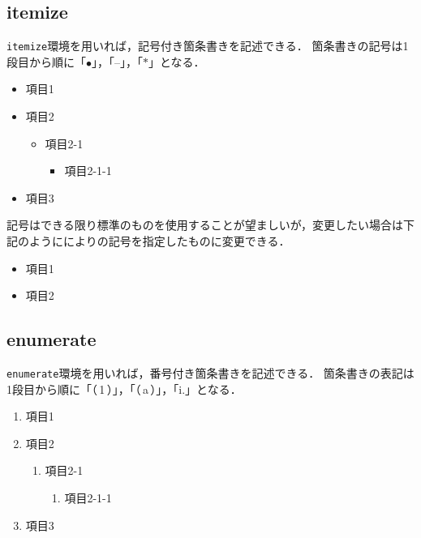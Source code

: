 \documentclass[a4j,11pt]{ujreport}
\begin{document}
\subsection{itemize}
\texttt{itemize}環境を用いれば，記号付き箇条書きを記述できる．
箇条書きの記号は1段目から順に「$\bullet$」，「--」，「$\ast$」となる．

\begin{screen}
\begin{itemize}
\renewcommand{\labelitemi}{＃}
\item 項目1
\item 項目2
\begin{itemize}
\item 項目2-1
\begin{itemize}
\item 項目2-1-1
\end{itemize}
\end{itemize}
\item 項目3
\end{itemize}
\end{screen}

記号はできる限り標準のものを使用することが望ましいが，変更したい場合は下記のようにによりの記号を指定したものに変更できる．

\begin{minipage}[t]{0.7\hsize}
\end{screen}
\end{minipage}

\subsection{enumerate}
\texttt{enumerate}環境を用いれば，番号付き箇条書きを記述できる．
箇条書きの表記は1段目から順に「（\,1\,）」，「（\,a\,）」，「i.」となる．

\begin{screen}
\begin{enumerate}
\item 項目1
\item 項目2
\begin{enumerate}
\item 項目2-1
\begin{enumerate}
\item 項目2-1-1
\end{enumerate}
\end{enumerate}
\item 項目3
\end{enumerate}
\end{screen}
\end{document}
